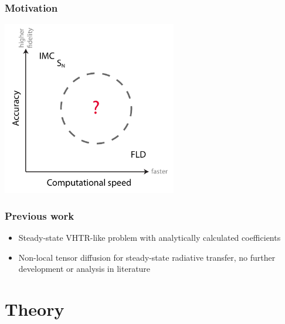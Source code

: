 \documentclass{beamer}
\begin{document}
\begin{frame}
  \frametitle{Motivation}
\begin{center}
  \includegraphics[width=3in]{../figures/fidelity}
\end{center}
\end{frame}
\begin{frame}
  \frametitle{Previous work}
  \begin{itemize}
    \item Steady-state VHTR-like problem with analytically calculated
      coefficients \cite{Lar2009c}
    \item Non-local tensor diffusion \cite{Mor2007} for steady-state
      radiative transfer, no further development or
      analysis in literature
  \end{itemize}
\end{frame}
\section{Theory}
\end{document}

